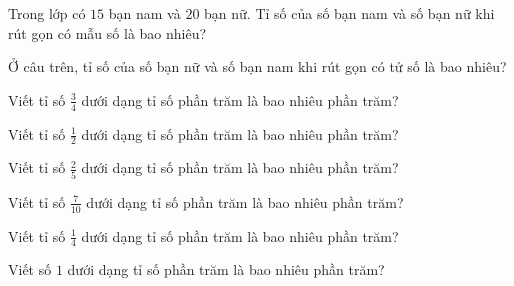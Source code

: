 
\begin{ex}
  Trong lớp có $15$ bạn nam và $20$ bạn nữ. Tỉ số của số bạn nam và số bạn nữ khi rút gọn có mẫu số là bao nhiêu?
\end{ex}

\begin{ex}
  Ở câu trên, tỉ số của số bạn nữ và số bạn nam khi rút gọn có tử số là bao nhiêu?
\end{ex}

\begin{ex}
  Viết tỉ số $\frac{3}{4}$ dưới dạng tỉ số phần trăm là bao nhiêu phần trăm?
\end{ex}

\begin{ex}
  Viết tỉ số $\frac{1}{2}$ dưới dạng tỉ số phần trăm là bao nhiêu phần trăm?
\end{ex}

\begin{ex}
  Viết tỉ số $\frac{2}{5}$ dưới dạng tỉ số phần trăm là bao nhiêu phần trăm?
\end{ex}

\begin{ex}
  Viết tỉ số $\frac{7}{10}$ dưới dạng tỉ số phần trăm là bao nhiêu phần trăm?
\end{ex}

\begin{ex}
  Viết tỉ số $\frac{1}{4}$ dưới dạng tỉ số phần trăm là bao nhiêu phần trăm?
\end{ex}

\begin{ex}
  Viết số $1$ dưới dạng tỉ số phần trăm là bao nhiêu phần trăm?
\end{ex}

